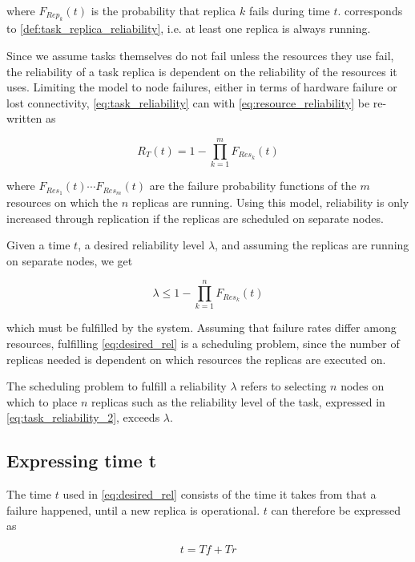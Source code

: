 \documentclass{cslthse-msc}
\begin{document}
where $F_{Rep_k}(t)$ is the probability that replica $k$ fails during time $t$.  corresponds to \cref{def:task_replica_reliability}, i.e. at least one replica is always running.

Since we assume tasks themselves do not fail unless the resources they use fail, the reliability of a task replica is dependent on the reliability of the resources it uses. Limiting the model to node failures, either in terms of hardware failure or lost connectivity, \cref{eq:task_reliability} can with \cref{eq:resource_reliability} be re-written as

\begin{equation} \label{eq:task_reliability_2}
R_{T}(t) = 1 - \prod\limits_{k=1}^m  F_{Res_k}(t)
\end{equation}

where $F_{Res_1}(t) \cdots F_{Res_m}(t)$ are the failure probability functions of the $m$ resources on which the $n$ replicas are running. Using this model, reliability is only increased through replication if the replicas are scheduled on separate nodes.

Given a time $t$, a desired reliability level $\lambda$, and assuming the replicas are running on separate nodes, we get

\begin{equation} \label{eq:desired_rel}
\lambda \leq 1 - \prod\limits_{k=1}^n  F_{Res_k}(t)
\end{equation}

which must be fulfilled by the system. Assuming that failure rates differ among resources, fulfilling \cref{eq:desired_rel} is a scheduling problem, since the number of replicas needed is dependent on which resources the replicas are executed on.

The scheduling problem to fulfill a reliability $\lambda$ refers to selecting $n$ nodes on which to place $n$ replicas such as the reliability level of the task, expressed in \cref{eq:task_reliability_2}, exceeds $\lambda$.

\subsection{Expressing time t} \label{sec:design_time_t}
The time $t$ used in \cref{eq:desired_rel} consists of the time it takes from that a failure happened, until a new replica is operational. $t$ can therefore be expressed as 

\begin{equation} \label{eq:rep_time}
	t = Tf + Tr
\end{equation}
\end{document}
